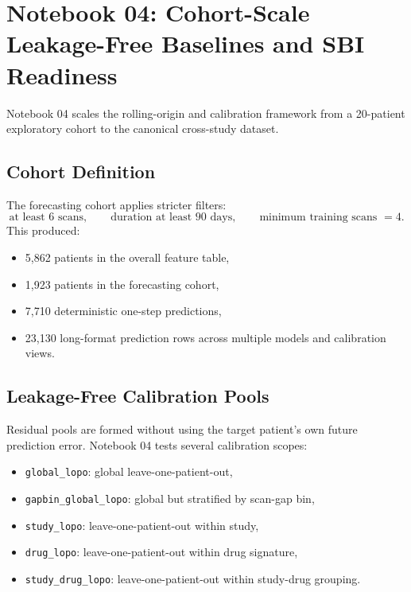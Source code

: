 \documentclass[11pt,a4paper]{article}
\begin{document}
\section{Notebook 04: Cohort-Scale Leakage-Free Baselines and SBI Readiness}

Notebook 04 scales the rolling-origin and calibration framework from a 20-patient exploratory cohort to the canonical cross-study dataset.

\subsection{Cohort Definition}

The forecasting cohort applies stricter filters:
\[
    \text{at least 6 scans},\qquad
    \text{duration at least 90 days},\qquad
    \text{minimum training scans }=4.
\]
This produced:
\begin{itemize}[leftmargin=2em]
    \item 5,862 patients in the overall feature table,
    \item 1,923 patients in the forecasting cohort,
    \item 7,710 deterministic one-step predictions,
    \item 23,130 long-format prediction rows across multiple models and calibration views.
\end{itemize}

\subsection{Leakage-Free Calibration Pools}

Residual pools are formed without using the target patient's own future prediction error. Notebook 04 tests several calibration scopes:
\begin{itemize}[leftmargin=2em]
    \item \texttt{global\_lopo}: global leave-one-patient-out,
    \item \texttt{gapbin\_global\_lopo}: global but stratified by scan-gap bin,
    \item \texttt{study\_lopo}: leave-one-patient-out within study,
    \item \texttt{drug\_lopo}: leave-one-patient-out within drug signature,
    \item \texttt{study\_drug\_lopo}: leave-one-patient-out within study-drug grouping.
\end{itemize}
\end{document}
